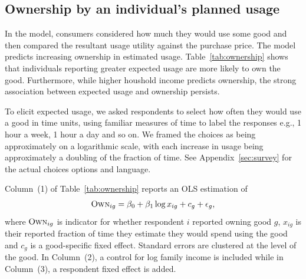 \documentclass[11pt]{article}
\begin{document}
\subsection{Ownership by an individual's planned usage} 
In the model, consumers considered how much they would use some good and then compared the resultant usage utility against the purchase price. 
The model predicts increasing ownership in estimated usage.
Table~\ref{tab:ownership} shows that individuals reporting greater expected usage are more likely to own the good.
Furthermore, while higher houshold income predicts ownership, the strong association between expected usage and ownership persists.

To elicit expected usage, we asked respondents to select how often they would use a good in time units, using familiar measures of time to label the responses e.g., 1 hour a week, 1 hour a day and so on.
We framed the choices as being approximately on a logarithmic scale, with each increase in usage being approximately a doubling of the fraction of time.
See Appendix~\ref{sec:survey} for the actual choices options and language.

Column~(1) of Table~\ref{tab:ownership} reports an OLS estimation of 
\begin{align} \label{eq:base_own}
\textsc{Own}_{ig} = \beta_0 + \beta_1 \log x_{ig} + c_{g} + \epsilon_{g}, 
\end{align}
where $\textsc{Own}_{ig}$ is indicator for whether respondent $i$ reported owning good $g$, $x_{ig}$ is their reported fraction of time they estimate they would spend using the good and $c_g$ is a good-specific fixed effect.
Standard errors are clustered at the level of the good. 
In Column~(2), a control for log family income is included while in Column~(3), a respondent fixed effect is added. 


\end{document}
